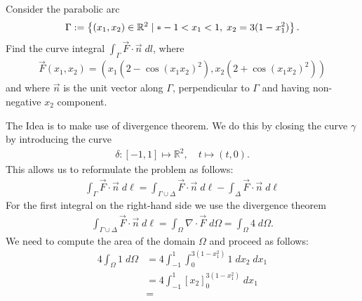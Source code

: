 \documentclass[11pt]{article}
\begin{document}
\begin{exercise}
    Consider the parabolic arc 
    \begin{gather*}
        \Gamma := \left\{ (x_1,x_2) \in \bbR^{2} \suchthat* -1 < x_1 < 1, \; x_2 = 3 ( 1 - x_1^2 ) \right\}.
    \end{gather*}
    Find the curve integral $\int_\Gamma \vec F \cdot \vec{n} \;dl$, where 
    \begin{gather*}
        \vec F(x_1,x_2) 
        = 
        \left( 
            x_1 ( 2 - \cos(x_1x_2)^{2} )
            , 
            x_2 ( 2 + \cos(x_1x_2)^{2} ) 
        \right)
    \end{gather*}
    and where $\vec{n}$ is the unit vector along $\Gamma$, perpendicular to $\Gamma$ and having non-negative $x_2$ component.
\end{exercise}
\begin{solution}
    The Idea is to make use of divergence theorem. 
    We do this by closing the curve $\gamma$ by introducing the curve 
    \begin{gather*}
        \delta: [-1,1] \mapsto \mathbb{R}^2, \quad t \mapsto  (t,0).
    \end{gather*}
    This allows us to reformulate the problem as follows:
    \begin{gather*}
        \int_{\Gamma} \vec{F} \cdot \vec{n} \; d\ell
        =
        \int_{\Gamma\cup \Delta} \vec{F} \cdot \vec{n} \; d\ell
        -
        \int_{\Delta} \vec{F}\cdot \vec{n} \;d \ell
    \end{gather*}
    For the first integral on the right-hand side we use the divergence theorem
    \begin{align*}
        \int_{\Gamma\cup\Delta} \vec{F} \cdot \vec{n} \; d\ell 
        = 
        \int_{\Omega} \nabla\cdot\vec{F}\;d \Omega
        =
        \int_{\Omega} 4\;d \Omega
        .
    \end{align*}
    We need to compute the area of the domain $\Omega$ and proceed as follows: 
    \begin{align*}
        4\int_{\Omega} 1\;d \Omega
        &=
        4 \int_{-1}^1\int_{0}^{3(1-x_1^2)} 1 \;d x_2 \;d x_1
        \\&=
        4 \int_{-1}^1\left[x_2\right]_{0}^{3(1-x_1^2)} \;d x_1
        \\&=

\end{align*}
\end{solution}
\end{document}
